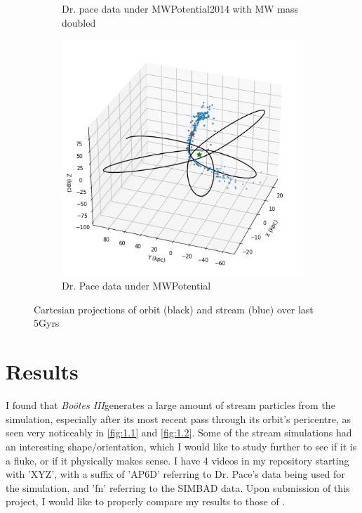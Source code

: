 \documentclass[12pt]{article}
\newcommand{\boo}{\textit{Bo\"{o}tes III}}
\begin{document}
\begin{figure}[H]
\begin{subfigure}{.45\textwidth}
  \caption{Dr. pace data under MWPotential2014 with MW mass doubled}
  \label{fig:1.3}
\end{subfigure}
\begin{subfigure}{.45\textwidth}
  \centering
  \includegraphics[width=\linewidth]{MWPot_orbit_AP6D.png}
  \caption{Dr. Pace data under MWPotential}
  \label{fig:1.4}
\end{subfigure}
\caption{Cartesian projections of orbit (black) and stream (blue) over last 5Gyrs}
\label{fig:1}
\end{figure}

\pagebreak

\section{Results}
I found that \boo generates a large amount of stream particles from the simulation, especially after its most recent pass through its orbit's pericentre, as seen very noticeably in \ref{fig:1.1} and \ref{fig:1.2}. Some of the stream simulations had an interesting shape/orientation, which I would like to study further to see if it is a fluke, or if it physically makes sense.
I have 4 videos in my repository starting with 'XYZ', with a suffix of 'AP6D' referring to Dr. Pace's data being used for the simulation, and 'fn' referring to the SIMBAD data.
Upon submission of this project, I would like to properly compare my results to those of \cite{Carlin_2018}.
\end{document}
